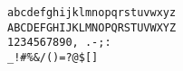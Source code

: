 \documentclass[preview]{standalone}
\begin{document}
\begin{center}
\texttt{abcdefghijklmnopqrstuvwxyz\\ABCDEFGHIJKLMNOPQRSTUVWXYZ\\1234567890, .-;:\\_!\"\#\%&/()=?@\$[]}
\end{center}
\end{document}
